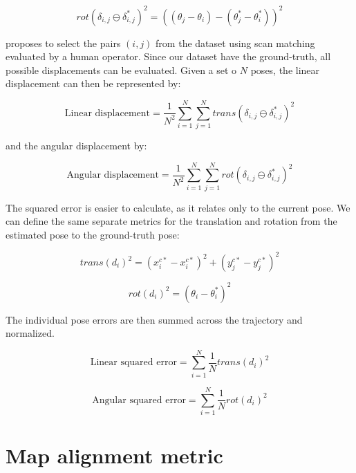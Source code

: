 \begin{equation}
rot(\delta_{i,j} \ominus \delta_{i,j}^*)^2 = 
((\theta_j - \theta_i) - (\theta_j^* - \theta_i^*))^2
\end{equation}

\citeauthor{kummerle2009measuring} proposes to select the pairs $(i,j)$ from the dataset using scan matching evaluated by a human operator. Since our dataset have the ground-truth, all possible displacements can be evaluated. Given a set o $N$ poses, the linear displacement can then be represented by:

\begin{equation}
\text{Linear displacement} = \frac{1}{N^2} \sum_{i = 1}^N \sum_{j = 1}^N trans(\delta_{i,j} \ominus \delta_{i,j}^*)^2
\end{equation}

and the angular displacement by:

\begin{equation}
\text{Angular displacement} = \frac{1}{N^2} \sum_{i = 1}^N \sum_{j = 1}^N rot(\delta_{i,j} \ominus \delta_{i,j}^*)^2
\end{equation}

The squared error is easier to calculate, as it relates only to the current pose. We can define the same separate metrics for the translation and rotation from the estimated pose to the ground-truth pose:

\begin{equation}
trans(d_i)^2 = (x^{c*}_i - x^{c*}_i)^2 + (y^{c*}_j - y^{c*}_j)^2
\end{equation}

\begin{equation}
rot(d_i)^2 = (\theta_i - \theta^*_i)^2
\end{equation}

The individual pose errors are then summed across the trajectory and normalized.

\begin{equation}
\text{Linear squared error} = \sum_{i=1}^N \frac{1}{N} trans(d_i)^2
\end{equation}

\begin{equation}
\text{Angular squared error} = \sum_{i=1}^N \frac{1}{N} rot(d_i)^2
\end{equation}

\section{Map alignment metric} \label{sec:icp}

